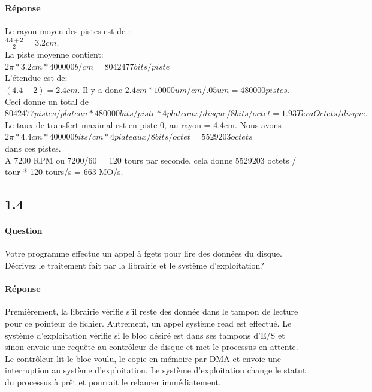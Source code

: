 \documentclass[oneside]{book}
\begin{document}
\paragraph{Réponse}
Le rayon moyen des pistes est de :\\
$\frac{4.4+2}{2} = 3.2cm.$ \\
La piste moyenne contient:\\
$2 \pi * 3.2cm * 400000 b/cm = 8042477 bits/piste$\\
L'étendue est de:\\
$(4.4 -2) = 2.4cm.$ Il y a donc $2.4cm * 10000um/cm / .05um = 480000 pistes.$\\

Ceci donne un total de\\

 $8042477 pistes/plateau * 480000 bits/piste * 4
plateaux/disque / 8 bits/octet = 1.93 TeraOctets/disque.$\\

Le taux de transfert maximal est en piste 0, au rayon = 4.4cm. Nous avons\\

$2 \pi *
4.4cm * 400000 bits/cm * 4 plateaux / 8 bits/octet = 5529203 octets$ \\
dans ces pistes. \\
A 7200 RPM ou 7200/60 = 120 tours par seconde, cela donne 5529203
octets / tour * 120 tours/s = 663 MO/s.
\subsection{1.4}
\paragraph{Question}
Votre programme effectue un appel à fgets pour lire des données du disque.
Décrivez le traitement fait par la librairie et le système d'exploitation?
\paragraph{Réponse}
Premièrement, la librairie vérifie s'il reste des donnée dans le tampon de lecture
pour ce pointeur de fichier. Autrement, un appel système read est effectué. Le
système d'exploitation vérifie si le bloc désiré est dans ses tampons d'E/S et
sinon envoie une requête au contrôleur de disque et met le processus en attente.
Le contrôleur lit le bloc voulu, le copie en mémoire par DMA et envoie une
interruption au système d'exploitation. Le système d'exploitation change le statut
du processus à prêt et pourrait le relancer immédiatement.
\end{document}
